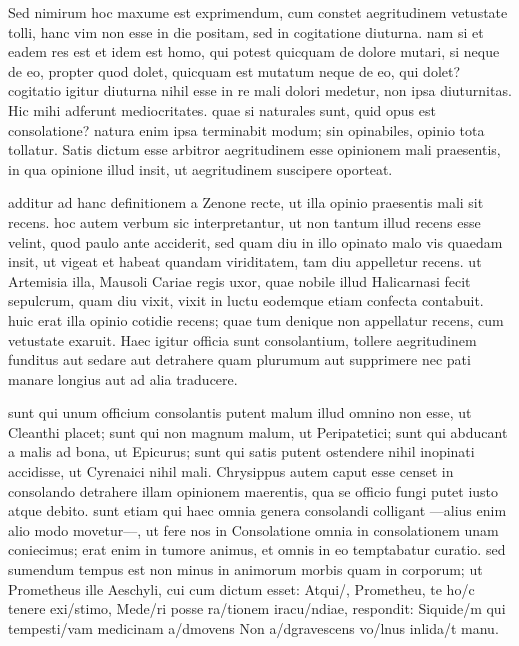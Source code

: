  Sed nimirum hoc maxume est exprimendum, cum constet aegritudinem vetustate tolli, hanc vim non esse in die positam, sed in cogitatione diuturna. nam si et eadem res est et idem est homo, qui potest quicquam de dolore mutari, si neque de eo, propter quod dolet, quicquam est mutatum neque de eo, qui dolet? cogitatio igitur diuturna nihil esse in re mali dolori medetur, non ipsa diuturnitas. Hic mihi adferunt mediocritates. quae si naturales sunt, quid opus est consolatione? natura enim ipsa terminabit modum; sin opinabiles, opinio tota tollatur. Satis dictum esse arbitror aegritudinem esse opinionem mali praesentis, in qua opinione illud insit, ut aegritudinem suscipere oporteat.

 additur ad hanc definitionem a Zenone recte, ut illa opinio praesentis mali sit recens. hoc autem verbum sic interpretantur, ut non tantum illud recens esse velint, quod paulo ante acciderit, sed quam diu in illo opinato malo vis quaedam insit, ut vigeat et habeat quandam viriditatem, tam diu appelletur recens. ut Artemisia illa, Mausoli Cariae regis uxor, quae nobile illud Halicarnasi fecit sepulcrum, quam diu vixit, vixit in luctu eodemque etiam confecta contabuit. huic erat illa opinio cotidie recens; quae tum denique non appellatur recens, cum vetustate exaruit. Haec igitur officia sunt consolantium, tollere aegritudinem funditus aut sedare aut detrahere quam plurumum aut supprimere nec pati manare longius aut ad alia traducere.

 sunt qui unum officium consolantis putent malum illud omnino non esse, ut Cleanthi placet; sunt qui non magnum malum, ut Peripatetici; sunt qui abducant a malis ad bona, ut Epicurus; sunt qui satis putent ostendere nihil inopinati accidisse, ut Cyrenaici nihil mali. Chrysippus autem caput esse censet in consolando detrahere illam opinionem maerentis, qua se officio fungi putet iusto atque debito. sunt etiam qui haec omnia genera consolandi colligant —alius enim alio modo movetur—, ut fere nos in Consolatione omnia in consolationem unam coniecimus; erat enim in tumore animus, et omnis in eo temptabatur curatio. sed sumendum tempus est non minus in animorum morbis quam in corporum; ut Prometheus ille Aeschyli, cui cum dictum esset: Atqui/, Prometheu, te ho/c tenere exi/stimo, Mede/ri posse ra/tionem iracu/ndiae, respondit: Siquide/m qui tempesti/vam medicinam a/dmovens Non a/dgravescens vo/lnus inlida/t manu.

